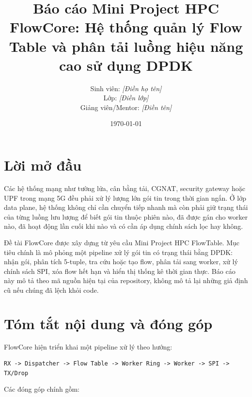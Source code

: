 \documentclass[12pt,a4paper]{report}
\title{
    \textbf{Báo cáo Mini Project HPC}\\
    \Large FlowCore: Hệ thống quản lý Flow Table và phân tải luồng hiệu năng cao sử dụng DPDK
}
\author{
    Sinh viên: \textit{[Điền họ tên]}\\
    Lớp: \textit{[Điền lớp]}\\
    Giảng viên/Mentor: \textit{[Điền tên]}
}
\date{\today}
\DeclareRobustCommand{\code}[1]{{\small\texttt{#1}}}
\begin{document}


\chapter*{Lời mở đầu}

Các hệ thống mạng như tường lửa, cân bằng tải, CGNAT, security gateway hoặc UPF trong mạng 5G đều phải xử lý lượng lớn gói tin trong thời gian ngắn. Ở lớp data plane, hệ thống không chỉ cần chuyển tiếp nhanh mà còn phải giữ trạng thái của từng luồng lưu lượng để biết gói tin thuộc phiên nào, đã được gán cho worker nào, đã hoạt động lần cuối khi nào và có cần áp dụng chính sách lọc hay không.

Đề tài FlowCore được xây dựng từ yêu cầu Mini Project HPC FlowTable. Mục tiêu chính là mô phỏng một pipeline xử lý gói tin có trạng thái bằng DPDK: nhận gói, phân tích 5-tuple, tra cứu hoặc tạo flow, phân tải sang worker, xử lý chính sách SPI, xóa flow hết hạn và hiển thị thống kê thời gian thực. Báo cáo này mô tả theo mã nguồn hiện tại của repository, không mô tả lại những giả định cũ nếu chúng đã lệch khỏi code.

\chapter*{Tóm tắt nội dung và đóng góp}

FlowCore hiện triển khai một pipeline xử lý theo hướng:

\begin{center}
\code{RX -> Dispatcher -> Flow Table -> Worker Ring -> Worker -> SPI -> TX/Drop}
\end{center}

Các đóng góp chính gồm:
\end{document}
